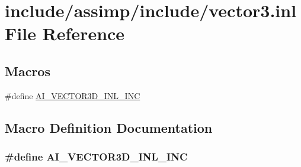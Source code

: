 \hypertarget{vector3_8inl}{\section{include/assimp/include/vector3.inl File Reference}
\label{vector3_8inl}
}
\subsection*{Macros}
\begin{DoxyCompactItemize}
\item 
\#define \hyperlink{vector3_8inl_a7409280d1fdec1b54ab4566ef44ac17b}{A\-I\-\_\-\-V\-E\-C\-T\-O\-R3\-D\-\_\-\-I\-N\-L\-\_\-\-I\-N\-C}
\end{DoxyCompactItemize}


\subsection{Macro Definition Documentation}
\hypertarget{vector3_8inl_a7409280d1fdec1b54ab4566ef44ac17b}{
\subsubsection[{A\-I\-\_\-\-V\-E\-C\-T\-O\-R3\-D\-\_\-\-I\-N\-L\-\_\-\-I\-N\-C}]{\setlength{\rightskip}{0pt plus 5cm}\#define A\-I\-\_\-\-V\-E\-C\-T\-O\-R3\-D\-\_\-\-I\-N\-L\-\_\-\-I\-N\-C}}\label{vector3_8inl_a7409280d1fdec1b54ab4566ef44ac17b}
